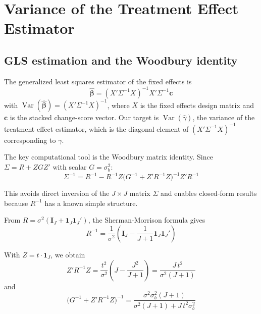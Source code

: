 \documentclass[
  11pt,
]{article}
\begin{document}
\section{Variance of the Treatment Effect
Estimator}\label{variance-of-the-treatment-effect-estimator}

\subsection{GLS estimation and the Woodbury
identity}\label{gls-estimation-and-the-woodbury-identity}

The generalized least squares estimator of the fixed effects is
\begin{equation}
  \hat{\boldsymbol{\beta}} = (X' \Sigma^{-1} X)^{-1} X' \Sigma^{-1}
  \mathbf{c}
  \label{eq:gls}
\end{equation} with
\(\mathop{\mathrm{Var}}(\hat{\boldsymbol{\beta}}) = (X' \Sigma^{-1} X)^{-1}\),
where \(X\) is the fixed effects design matrix and \(\mathbf{c}\) is the
stacked change-score vector. Our target is
\(\mathop{\mathrm{Var}}(\hat{\gamma})\), the variance of the treatment
effect estimator, which is the diagonal element of
\((X' \Sigma^{-1} X)^{-1}\) corresponding to \(\gamma\).

The key computational tool is the Woodbury matrix identity. Since
\(\Sigma = R + Z G Z'\) with scalar \(G = \sigma_b^2\): \begin{equation}
  \Sigma^{-1} = R^{-1} - R^{-1} Z
    \bigl(G^{-1} + Z' R^{-1} Z\bigr)^{-1}
    Z' R^{-1}
  \label{eq:woodbury}
\end{equation}

This avoids direct inversion of the \(J \times J\) matrix \(\Sigma\) and
enables closed-form results because \(R^{-1}\) has a known simple
structure.

From \(R = \sigma^2(\mathbf{I}_J + \mathbf{1}_J
\mathbf{1}_J')\), the Sherman-Morrison formula gives \begin{equation}
  R^{-1} = \frac{1}{\sigma^2}\left(
    \mathbf{I}_J - \frac{1}{J+1}
    \mathbf{1}_J \mathbf{1}_J'
  \right)
  \label{eq:Rinv}
\end{equation}

With \(Z = t \cdot \mathbf{1}_J\), we obtain \begin{equation}
  Z' R^{-1} Z = \frac{t^2}{\sigma^2}
    \left(J - \frac{J^2}{J+1}\right)
  = \frac{J\, t^2}{\sigma^2(J+1)}
  \label{eq:ZRZ}
\end{equation} and \begin{equation}
  \bigl(G^{-1} + Z' R^{-1} Z\bigr)^{-1}
  = \frac{\sigma^2 \sigma_b^2 (J+1)}
    {\sigma^2(J+1) + J\, t^2 \sigma_b^2}
  \label{eq:H}
\end{equation}
\end{document}
